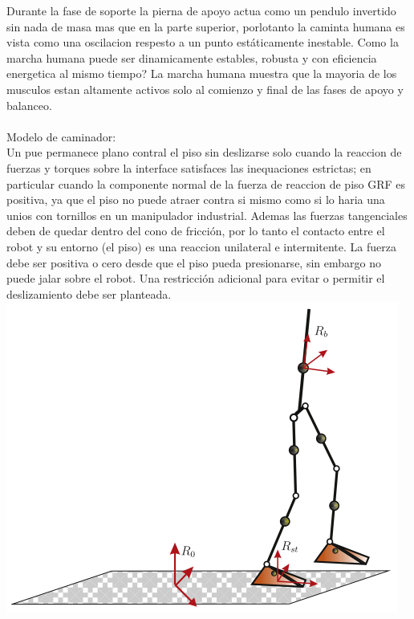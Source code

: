 \documentclass[10pt,onecolumn,twoside,letterpaper]{article}
\begin{document}
Durante la fase de soporte la pierna de apoyo actua como un pendulo invertido sin nada de masa mas que en la parte superior, porlotanto la caminta humana es vista como una oscilacion respesto a un punto est\'aticamente inestable. Como la marcha humana puede ser dinamicamente estables, robusta y con eficiencia energetica al mismo tiempo? La marcha humana muestra que la mayoria de los musculos estan altamente activos solo al comienzo y final de las fases de apoyo y balanceo\cite{Verdaasdonk2009}.\\
\href{run:/home/jackmaster/Downloads/Doc Thesis/Walkers/[2009 B W Verdaasdonk and H F J M Koopman and F C T van der Helm] Art Energy efficient walking with central pattern generators: from passive dynamic walking to biologically inspired control.pdf}{
}\cite{Verdaasdonk2009}\\
Modelo de caminador:\\
Un pue permanece plano contral el piso sin deslizarse solo cuando la reaccion de fuerzas y torques sobre la interface satisfaces las inequaciones estrictas; en particular cuando la componente normal de la fuerza de reaccion de piso GRF es positiva, ya que el piso no puede atraer contra si mismo como si lo haria una unios con tornillos en un manipulador industrial. Ademas las fuerzas tangenciales deben de quedar dentro del cono de fricci\'on, por lo tanto el contacto entre el robot y su entorno (el piso) es una reaccion unilateral e intermitente. La fuerza debe ser positiva o cero desde que el piso pueda presionarse, sin embargo no puede jalar sobre el robot. Una restricci\'on adicional para evitar o permitir el deslizamiento debe ser planteada\cite{Grizzle2014}.\\
\includegraphics[scale=0.4]{../../images/GeneralBipedModel.png}\cite{Grizzle2014}\\
\end{document}
